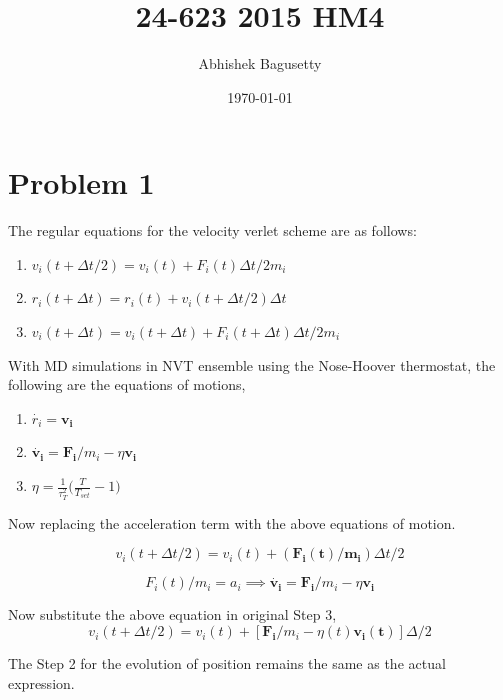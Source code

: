 \documentclass{article}
\author{Abhishek Bagusetty}
\date{\today}
\title{24-623 2015 HM4}
\begin{document}
\maketitle

\section{Problem 1}
\label{sec-1}
The regular equations for the velocity verlet scheme are as follows: 

\begin{enumerate}
\item $v_{i}(t+\Delta t/2) = v_{i}(t) + F_{i}(t) \Delta t/2m_{i}$
\item $r_{i}(t+\Delta t) = r_{i}(t) + v_{i}(t+\Delta t/2)\Delta t$
\item $v_{i}(t+\Delta t) = v_{i}(t+\Delta t)+ F_{i}(t+\Delta t) \Delta t/2m_{i}$
\end{enumerate}

With MD simulations in NVT ensemble using the Nose-Hoover thermostat, the following are the equations of motions,

\begin{enumerate}
\item $\dot{r_{i}} = \mathbf{v_{i}}$
\item $\dot{\mathbf{v_{i}}} = \mathbf{F_{i}}/m_{i} - \eta \mathbf{v_{i}}$
\item $\eta = \frac{1}{\tau^2_{T}} \Big(\frac{T}{T_{set}} -1 \Big)$
\end{enumerate}

Now replacing the acceleration term with the above equations of motion.

\begin{equation}
  v_{i}(t+\Delta t/2) = v_{i}(t) + (\mathbf{F_{i}(t)/m_{i}}) \Delta t/2
  \label{eq:eq1}
\end{equation}

\begin{equation}
F_{i}(t)/m_{i} = a_{i} \implies \dot{\mathbf{v_{i}}} = \mathbf{F_{i}}/m_{i} - \eta \mathbf{v_{i}}
\end{equation}

Now substitute the above equation in original Step 3,
\begin{equation}
\boxed{ v_{i}(t+\Delta t/2) = v_{i}(t) + [\mathbf{F_{i}}/m_{i} - \eta(t) \mathbf{v_{i}(t)}] \Delta/2 }
\end{equation}

The Step 2 for the evolution of position remains the same as the actual expression.
\end{document}
